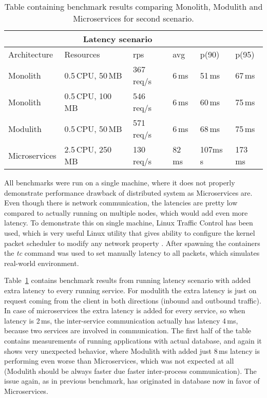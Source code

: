 \begin{table}
    \begin{tabular}{ |p{3cm}||p{3cm}|p{1.5cm}|p{1.5cm}|p{1.5cm}|p{1.5cm}| }
        \hline
        \multicolumn{5}{|c|}{Latency scenario}                                       \\
        \hline
        Architecture  & Resources         & rps        & avg    & p(90)    & p(95)   \\
        \hline
        \rowcolor{Gray}
        Monolith      & 0.5\,CPU, 50\,MB  & 367\,req/s & 6\,ms  & 51\,ms   & 67\,ms  \\
        Monolith      & 0.5\,CPU, 100\,MB & 546\,req/s & 6\,ms  & 60\,ms   & 75\,ms  \\
        \rowcolor{Gray}
        Modulith      & 0.5\,CPU, 50\,MB  & 571\,req/s & 6\,ms  & 68\,ms   & 75\,ms  \\
        Microservices & 2.5\,CPU, 250\,MB & 130\,req/s & 82\,ms & 107ms\,s & 173\,ms \\
        \hline
    \end{tabular}
    \caption{Table containing benchmark results comparing Monolith, Modulith and Microservices for second scenario.\label{table:benchmark_scenario2}}
\end{table}

All benchmarks were run on a single machine, where it does not properly demonstrate performance drawback of distributed system as Microservices are. Even though there is network communication, the latencies are pretty low compared to actually running on multiple nodes, which would add even more latency. To demonstrate this on single machine, Linux Traffic Control has been used, which is very useful Linux utility that gives ability to configure the kernel packet scheduler to modify any network property \cite{MAN_TRAFFIC_CONTROLL}. After spawning the containers the \textit{tc} command was used to set manually latency to all packets, which simulates real-world environment.

Table~\ref{table:benchmark_scenario2} contains benchmark results from running latency scenario with added extra latency to every running service. For modulith the extra latency is just on request coming from the client in both directions (inbound and outbound traffic). In case of microservices the extra latency is added for every service, so when latency is 2\,ms, the inter-service communication actually has latency 4\,ms, because two services are involved in communication. The first half of the table contains measurements of running applications with actual database, and again it shows very unexpected behavior, where Modulith with added just 8\,ms latency is performing even worse than Microservices, which was not expected at all (Modulith should be always faster due faster inter-process communication). The issue again, as in previous benchmark, has originated in database now in favor of Microservices.


